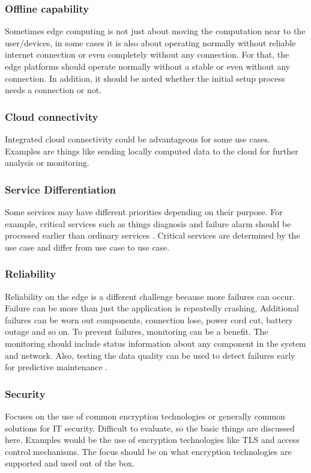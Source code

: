 \subsubsection*{Offline capability}
Sometimes edge computing is not just about moving the computation near to the user/devices, in some cases it is also about operating normally without reliable internet connection or even completely without any connection. For that, the edge platforms should operate normally without a stable or even without any connection. In addition, it should be noted whether the initial setup process needs a connection or not.

\subsubsection*{Cloud connectivity}
Integrated cloud connectivity could be advantageous for some use cases. Examples are things like sending locally computed data to the cloud for further analysis or monitoring.

\subsubsection*{Service Differentiation}
Some services may have different priorities depending on their purpose. For example, critical services such as things diagnosis and failure alarm should be processed earlier than ordinary services \cite{Shi2016b}. Critical services are determined by the use case and differ from use case to use case.

\subsubsection*{Reliability}
Reliability on the edge is a different challenge because more failures can occur. Failure can be more than just the application is repeatedly crashing. Additional failures can be worn out components, connection lose, power cord cut, battery outage and so on. To prevent failures, monitoring can be a benefit. The monitoring should include status information about any component in the system and network. Also, testing the data quality can be used to detect failures early for predictive maintenance \cite{Shi2016b}.

\subsubsection*{Security}
Focuses on the use of common encryption technologies or generally common solutions for IT security. Difficult to evaluate, so the basic things are discussed here. Examples would be the use of encryption technologies like \gls{TLS} and access control mechanisms. The focus should be on what encryption technologies are supported and used out of the box.

